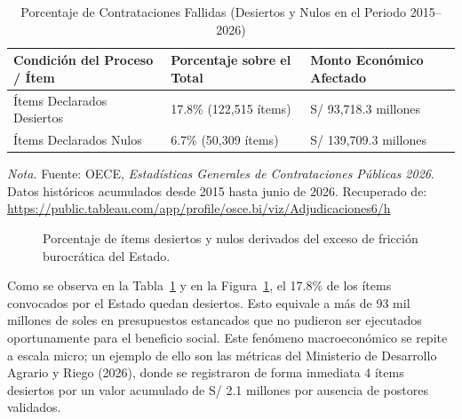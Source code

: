 \documentclass[12pt,a4paper]{article}
\begin{document}
\begin{table}[htbp]
\caption{Porcentaje de Contrataciones Fallidas (Desiertos y Nulos en el Periodo 2015--2026)}
\label{tab:fallidas}
\centering
\begin{tabular}{lll}
\toprule
\textbf{Condición del Proceso / Ítem} & \textbf{Porcentaje sobre el Total} & \textbf{Monto Económico Afectado} \\
\midrule
Ítems Declarados Desiertos & 17.8\% (122,515 ítems) & S/ 93,718.3 millones \\
Ítems Declarados Nulos & 6.7\% (50,309 ítems) & S/ 139,709.3 millones \\
\bottomrule
\end{tabular}
\vspace{0.2cm}
\begin{flushleft}
\small \textit{Nota.} Fuente: OECE, \textit{Estadísticas Generales de Contrataciones Públicas 2026}. Datos históricos acumulados desde 2015 hasta junio de 2026. Recuperado de: \url{https://public.tableau.com/app/profile/osce.bi/viz/Adjudicaciones6/h}
\end{flushleft}
\end{table}

\begin{figure}[htbp]
\centering
{}
\caption{Porcentaje de ítems desiertos y nulos derivados del exceso de fricción burocrática del Estado.}
\label{fig:barras_desiertos}
\end{figure}

Como se observa en la Tabla~\ref{tab:fallidas} y en la Figura~\ref{fig:barras_desiertos}, el 17.8\% de los ítems convocados por el Estado quedan desiertos. Esto equivale a más de 93 mil millones de soles en presupuestos estancados que no pudieron ser ejecutados oportunamente para el beneficio social. Este fenómeno macroeconómico se repite a escala micro; un ejemplo de ello son las métricas del Ministerio de Desarrollo Agrario y Riego (2026), donde se registraron de forma inmediata 4 ítems desiertos por un valor acumulado de S/ 2.1 millones por ausencia de postores validados.
\end{document}
